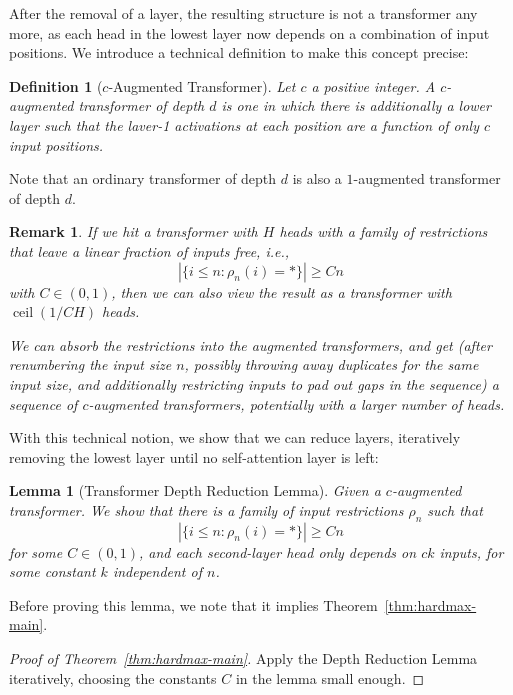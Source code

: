 \documentclass[11pt,a4paper]{article}
\newcounter{theorem}
\newtheorem{defin}[theorem]{Definition}
\newtheorem{remark}[theorem]{Remark}
\newtheorem{lemma}[theorem]{Lemma}
\begin{document}
After the removal of a layer, the resulting structure is not a transformer any more, as each head in the lowest layer now depends on a combination of input positions.
We introduce a technical definition to make this concept precise:

\begin{defin}[$c$-Augmented Transformer]
Let $c$ a positive integer. A $c$-augmented transformer of depth $d$ is one in which there is additionally a lower layer such that the laver-1 activations at each position are a function of only $c$ input positions.
\end{defin}

Note that an ordinary transformer  of depth $d$ is also a $1$-augmented transformer of depth $d$.

\begin{remark}
If we hit a transformer with $H$ heads with a family of restrictions that leave a linear fraction of inputs free, i.e.,
\begin{equation}
|\{i \leq n: \rho_n(i) = *\}| \geq Cn
\end{equation}
with $C \in (0,1)$, then we can also view the result as a transformer with $\operatorname{ceil}(1/C H)$ heads.

We can absorb the restrictions into the augmented transformers, and get (after renumbering the input size $n$, possibly throwing away duplicates for the same input size, and additionally restricting inputs to pad out gaps in the sequence) a sequence of $c$-augmented transformers, potentially with a larger number of heads.
\end{remark}
With this technical notion, we show that we can reduce layers, iteratively removing the lowest layer until no self-attention layer is left:
\begin{lemma}[Transformer Depth Reduction Lemma]
Given a $c$-augmented transformer. %
We show that there is a family of input restrictions $\rho_n$ %
such that
\begin{equation}
|\{i \leq n: \rho_n(i) = *\}| \geq Cn %
\end{equation}
for some $C \in (0,1)$,
and each second-layer head only depends on $ck$ inputs, for some constant $k$ independent of $n$.
\end{lemma}
Before proving this lemma, we note that it implies Theorem~\ref{thm:hardmax-main}.
\begin{proof}[Proof of Theorem~\ref{thm:hardmax-main}]
Apply the Depth Reduction Lemma iteratively, choosing the constants $C$ in the lemma small enough.
\end{proof}
\end{document}
